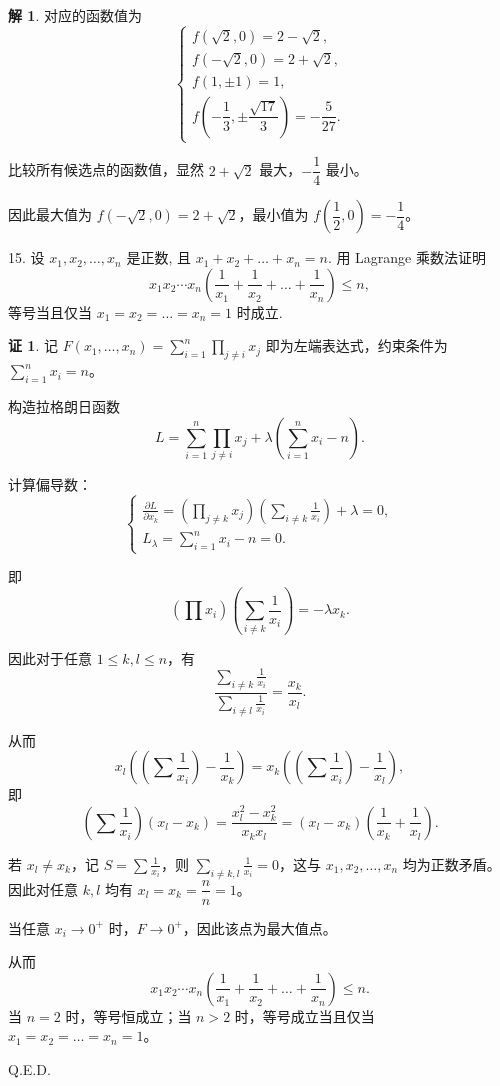 \documentclass[a4paper,12pt]{article}
\theoremstyle{definition}
\newtheorem*{pf}{证}
\newtheorem*{sol}{解}
\begin{document}
\begin{sol}
    对应的函数值为
    $$
        \begin{cases}
            f(\sqrt{2},0)=2-\sqrt{2},  \\[8pt]
            f(-\sqrt{2},0)=2+\sqrt{2}, \\[8pt]
            f(1,\pm 1)=1,              \\[8pt]
            f\left(-\dfrac{1}{3},\pm\dfrac{\sqrt{17}}{3}\right)=-\dfrac{5}{27}.
        \end{cases}
    $$

    比较所有候选点的函数值，显然 $2+\sqrt{2}$ 最大，$-\dfrac{1}{4}$ 最小。

    因此最大值为 $f(-\sqrt{2},0)=2+\sqrt{2}$，最小值为 $f\left(\dfrac{1}{2},0\right)=-\dfrac{1}{4}$。
\end{sol}

15. 设 $x_1,x_2,\dots,x_n$ 是正数, 且 $x_1 + x_2 + \dots + x_n = n$. 用 Lagrange 乘数法证明
$$
    x_1x_2\cdots x_n \left( \frac{1}{x_1} + \frac{1}{x_2} + \dots + \frac{1}{x_n} \right) \leq n,
$$
等号当且仅当 $x_1 = x_2 = \dots = x_n = 1$ 时成立.
\begin{pf}
    记 $F(x_1,\dots,x_n)=\sum_{i=1}^n\prod_{j\ne i}x_j$ 即为左端表达式，约束条件为 $\sum_{i=1}^n x_i=n$。

    构造拉格朗日函数
    $$
        L=\sum_{i=1}^n\prod_{j\ne i}x_j+\lambda\left(\sum_{i=1}^n x_i-n\right).
    $$

    计算偏导数：
    $$
        \begin{cases}
            \displaystyle\frac{\partial L}{\partial x_k}=\left(\prod_{j\ne k}x_j\right)\left(\sum_{i\ne k}\frac{1}{x_i}\right)+\lambda=0, \\[12pt]
            \displaystyle L_\lambda=\sum_{i=1}^n x_i-n=0.
        \end{cases}
    $$

    即
    $$
        \left(\prod x_i\right)\left(\sum_{i\ne k}\frac{1}{x_i}\right)=-\lambda x_k.
    $$

    因此对于任意 $1\leq k,l\leq n$，有
    $$
        \frac{\sum_{i\ne k}\frac{1}{x_i}}{\sum_{i\ne l}\frac{1}{x_i}}=\frac{x_k}{x_l}.
    $$

    从而
    $$
        x_l\left(\left(\sum\frac{1}{x_i}\right)-\frac{1}{x_k}\right)=x_k\left(\left(\sum\frac{1}{x_i}\right)-\frac{1}{x_l}\right),
    $$
    即
    $$
        \left(\sum\frac{1}{x_i}\right)(x_l-x_k)=\frac{x_l^2-x_k^2}{x_kx_l}=(x_l-x_k)\left(\frac{1}{x_k}+\frac{1}{x_l}\right).
    $$

    若 $x_l\ne x_k$，记 $S=\sum\frac{1}{x_i}$，则 $\sum_{i\ne k,l}\frac{1}{x_i}=0$，这与 $x_1,x_2,\dots,x_n$ 均为正数矛盾。因此对任意 $k,l$ 均有 $x_l=x_k=\dfrac{n}{n}=1$。

    当任意 $x_i\to0^+$ 时，$F\to0^+$，因此该点为最大值点。

    从而
    $$
        x_1x_2\cdots x_n \left( \frac{1}{x_1} + \frac{1}{x_2} + \dots + \frac{1}{x_n} \right) \leq n.
    $$
    当 $n=2$ 时，等号恒成立；当 $n>2$ 时，等号成立当且仅当 $x_1 = x_2 = \dots = x_n = 1$。

    Q.E.D.
\end{pf}
\end{document}
